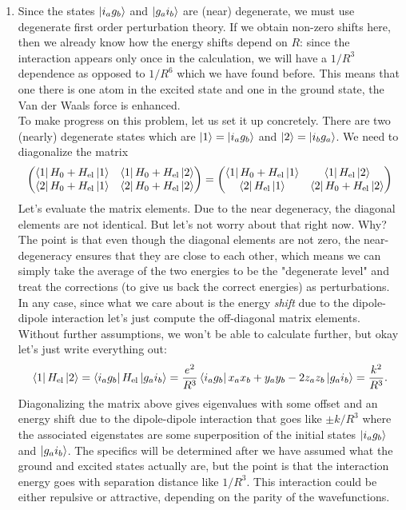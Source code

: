 \documentclass{article}
\theoremstyle{definition}
\newcommand{\f}[2]{\frac{#1}{#2}}
\begin{document}
\begin{enumerate}[label=(\alph*)]


\item Since the states $\ket{i_a g_b}$ and $\ket{g_a i_b}$ are (near) degenerate, we must use degenerate first order perturbation theory. If we obtain non-zero shifts here, then we already know how the energy shifts depend on $R$: since the interaction appears only once in the calculation, we will have a $\boxed{1/R^3}$ dependence as opposed to $1/R^6$ which we have found before. This means that one there is one atom in the excited state and one in the ground state, the Van der Waals force is enhanced. \\

To make progress on this problem, let us set it up concretely. There are two (nearly) degenerate states which are $\ket{1} = \ket{i_a g_b}$ and $\ket{2} = \ket{i_b g_a}$. We need to diagonalize the matrix
\begin{align*}
\begin{pmatrix}
\bra{1} H_0 + H_\text{el} \ket{1} & \bra{1} H_0 + H_\text{el} \ket{2} \\
\bra{2} H_0 + H_\text{el} \ket{1} & \bra{2} H_0 + H_\text{el} \ket{2}
\end{pmatrix} = 
\begin{pmatrix}
\bra{1} H_0 + H_\text{el} \ket{1} & \bra{1} H_\text{el} \ket{2} \\
\bra{2}  H_\text{el} \ket{1} & \bra{2} H_0 + H_\text{el} \ket{2}
\end{pmatrix} 
\end{align*}
Let's evaluate the matrix elements. Due to the near degeneracy, the diagonal elements are not identical. But let's not worry about that right now. Why? The point is that even though the diagonal elements are not zero, the near-degeneracy ensures that they are close to each other, which means we can simply take the average of the two energies to be the "degenerate level" and treat the corrections (to give us back the correct energies) as perturbations. In any case, since what we care about is the energy \textit{shift} due to the dipole-dipole interaction let's just compute the off-diagonal matrix elements. Without further assumptions, we won't be able to calculate further, but okay let's just write everything out:
\begin{align*}
\bra{1} H_\text{el} \ket{2} = \bra{i_a g_b} H_\text{el} \ket{g_a i_b} = 
\f{e^2}{R^3} \bra{i_a g_b} x_a x_b + y_a y_b - 2z_a z_b \ket{g_a i_b} = \f{k^2}{R^3}.
\end{align*}
Diagonalizing the matrix above gives eigenvalues with some offset and an energy shift due to the dipole-dipole interaction that goes like $\pm k/R^3$ where the associated eigenstates are some superposition of the initial states $\ket{i_a g_b}$ and $\ket{g_a i_b}$. The specifics will be determined after we have assumed what the ground and excited states actually are, but the point is that the interaction energy goes with separation distance like $1/R^3$. This interaction could be either repulsive or attractive, depending on the parity of the wavefunctions. \\


\end{enumerate}
\end{document}
